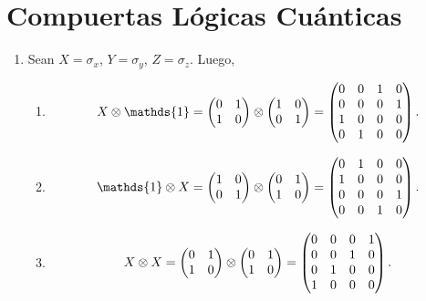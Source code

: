 \documentclass{scrartcl}
\DeclareRobustCommand{\[}{\begin{equation}}
\DeclareRobustCommand{\]}{\end{equation}}
\begin{document}
\section{Compuertas Lógicas Cuánticas}
\begin{enumerate}
    \item Sean $X = \sigma_x$, $Y = \sigma_y$, $Z = \sigma_z$. Luego,
    \begin{enumerate}
        \item
        \[
            X \otimes \mathds{1} =
            \begin{pmatrix}
                \mqty{\pmat{1}}
            \end{pmatrix}
            \otimes
            \begin{pmatrix}
                \mqty{\pmat{0}}
            \end{pmatrix}
            =
            \begin{pmatrix}
                \mqty{\mqty{\zmat{2}{2}} & \mqty{\pmat{0}} \\ \mqty{\pmat{0}} & \mqty{\zmat{2}{2}}}
            \end{pmatrix}.
        \]
        
        
        \item
        \[
            \mathds{1} \otimes X =
            \begin{pmatrix}
                \mqty{\pmat{0}}
            \end{pmatrix}
            \otimes
            \begin{pmatrix}
                \mqty{\pmat{1}}
            \end{pmatrix}
            =
            \begin{pmatrix}
                \mqty{\mqty{\pmat{1}} & \mqty{\zmat{2}{2}} \\ \mqty{\zmat{2}{2}} & \mqty{\pmat{1}}}
            \end{pmatrix}.
        \]
        
        
        \item
        \[
            X \otimes X =
            \begin{pmatrix}
                \mqty{\pmat{1}}
            \end{pmatrix}
            \otimes
            \begin{pmatrix}
                \mqty{\pmat{1}}
            \end{pmatrix}
            =
            \begin{pmatrix}
                \mqty{\mqty{\zmat{2}{2}} & \mqty{\pmat{1}} \\ \mqty{\pmat{1}} & \mqty{\zmat{2}{2}}}
            \end{pmatrix}.
        \]
        

\end{enumerate}
\end{enumerate}
\end{document}
